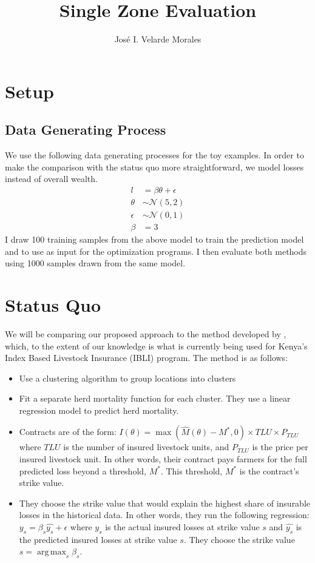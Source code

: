 \documentclass[11pt]{article}
\title{Single Zone Evaluation}
\author{José I. Velarde Morales}
\DeclareMathOperator*{\argmax}{arg\,max}
\begin{document}
\maketitle

\section{Setup}
    \subsection*{Data Generating Process}
    We use the following data generating processes for the toy examples. In order to make the comparison with the status quo more straightforward, we model losses instead of overall wealth. 
    \begin{align*}
        l&=\beta \theta + \epsilon\\
        \theta &\sim \mathcal{N}(5,2)\\
        \epsilon &\sim \mathcal{N}(0,1)\\
        \beta &= 3
    \end{align*}
    I draw 100 training samples from the above model to train the prediction model and to use as input for the optimization programs. I then evaluate both methods using 1000 samples drawn from the same model. 

\section{Status Quo}
We will be comparing our proposed approach to the method developed by \cite{chantarat2013designing}, which, to the extent of our knowledge is what is currently being used for Kenya's Index Based Livestock Insurance (IBLI) program. The method is as follows: 
\begin{itemize}
    \item Use a clustering algorithm to group locations into clusters
    \item Fit a separate herd mortality function for each cluster. They use a linear regression model to predict herd mortality. 
    \item Contracts are of the form: $I(\theta) = \max(\hat{M}(\theta)-M^*,0)\times TLU \times P_{TLU}$ where $TLU$ is the number of insured livestock units, and $P_{TLU}$ is the price per insured livestock unit. In other words, their contract pays farmers for the full predicted loss beyond a threshold, $M^*$. This threshold, $M^*$ is the contract's strike value. 
    \item They choose the strike value that would explain the highest share of insurable losses in the historical data. In other words, they run the following regression: $y_s = \beta_s \hat{y_s}+\epsilon$ where $y_s$ is the actual insured losses at strike value $s$ and $\hat{y_s}$ is the predicted insured losses at strike value $s$. They choose the strike value $s= \argmax_s \beta_s$. 
\end{itemize}
\end{document}

